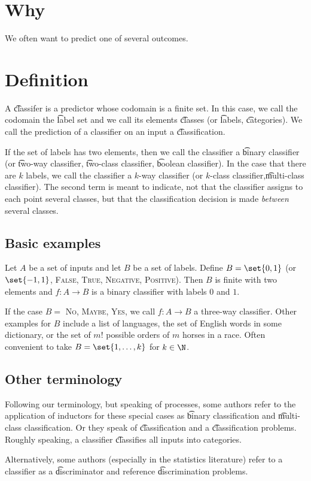 
\section*{Why}

We often want to predict one of several outcomes.

\section*{Definition}

A \t{classifer} is a predictor whose codomain is a finite set.
In this case, we call the codomain the \t{label set} and we call its elements \t{classes} (or \t{labels}, \t{categories}).
We call the prediction of a classifier on an input a \t{classification}.

If the set of labels has two elements, then we call the classifier a \t{binary classifier} (or \t{two-way classifier}, \t{two-class classifier}, \t{boolean classifier}).
In the case that there are $k$ labels, we call the classifier a \t{$k$-way classifier} (or \t{$k$-class classifier},\t{multi-class classifier}).
The second term is meant to indicate, not that the classifier assigns to each point several classes, but that the classification decision is made \textit{between} several classes.

\subsection*{Basic examples}

Let $A$ be a set of inputs and let $B$ be a set of labels.
Define $B = \set{0, 1}$ (or $\set{-1,1}$, {\textsc{False}, \textsc{True}}, {\textsc{Negative}, \textsc{Positive}}).
Then $B$ is finite with two elements and $f: A \to B$ is a binary classifier with labels $0$ and $1$.

If the case $B = $ {\textsc{No}, \textsc{Maybe}, \textsc{Yes}}, we call $f: A \to B$ a three-way classifier.
Other examples for $B$ include a list of languages, the set of English words in some dictionary, or the set of $m!$ possible orders of $m$ horses in a race.
Often convenient to take $B = \set{1, \dots , k}$ for $k \in \N $.

\subsection*{Other terminology}

Following our terminology, but speaking of processes, some authors refer to the application of inductors for these special cases as \t{binary classification} and \t{multi-class classification}.
Or they speak of \t{classification} and a \t{classification problems}.
Roughly speaking, a classifier \t{classifies} all inputs into categories.

Alternatively, some authors (especially in the statistics literature) refer to a classifier as a \t{discriminator} and reference \t{discrimination problems}.
